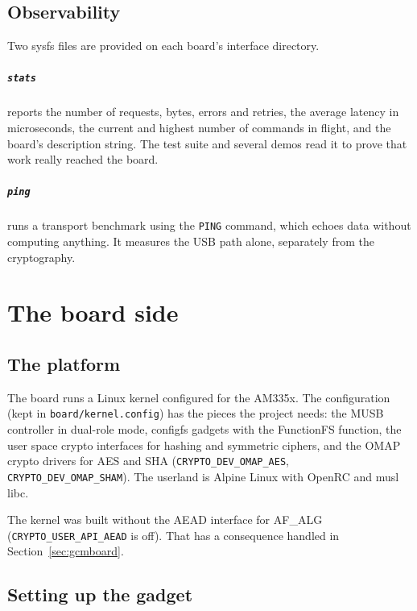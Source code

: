 \documentclass[11pt,a4paper,oneside]{report}
\newcommand{\code}[1]{\texttt{\small #1}}
\begin{document}
\section{Observability}

Two sysfs files are provided on each board's interface directory.

\paragraph{\code{stats}} reports the number of requests, bytes, errors and retries, the average latency in microseconds, the current and highest number of commands in flight, and the board's description string. The test suite and several demos read it to prove that work really reached the board.

\paragraph{\code{ping}} runs a transport benchmark using the \code{PING} command, which echoes data without computing anything. It measures the USB path alone, separately from the cryptography.



\chapter{The board side}\label{ch:board}

\section{The platform}

The board runs a Linux kernel configured for the AM335x. The configuration (kept in \code{board/kernel.config}) has the pieces the project needs: the MUSB controller in dual-role mode, configfs gadgets with the FunctionFS function, the user space crypto interfaces for hashing and symmetric ciphers, and the OMAP crypto drivers for AES and SHA (\code{CRYPTO\_DEV\_OMAP\_AES}, \code{CRYPTO\_DEV\_OMAP\_SHAM}). The userland is Alpine Linux with OpenRC and musl libc.

The kernel was built without the AEAD interface for AF\_ALG (\code{CRYPTO\_USER\_API\_AEAD} is off). That has a consequence handled in Section~\ref{sec:gcmboard}.

\section{Setting up the gadget}
\end{document}
